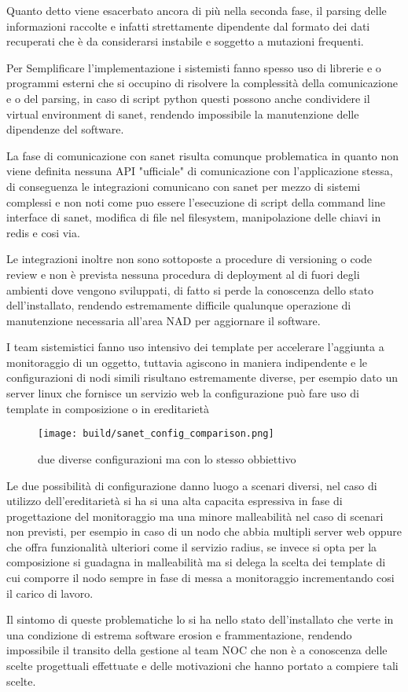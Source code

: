 Quanto detto viene esacerbato ancora di più nella seconda fase, il parsing delle informazioni raccolte e infatti strettamente dipendente dal formato dei dati recuperati che è da considerarsi instabile e soggetto a mutazioni frequenti.

Per Semplificare l'implementazione i sistemisti fanno spesso uso di librerie e o programmi esterni che si occupino di risolvere la complessità della comunicazione e o del parsing, in caso di script python questi possono anche condividere il virtual environment di sanet, rendendo impossibile la manutenzione delle dipendenze del software.

La fase di comunicazione con sanet risulta comunque problematica in quanto non viene definita nessuna API "ufficiale" di comunicazione con l'applicazione stessa, di conseguenza le integrazioni comunicano con sanet per mezzo di sistemi complessi e non noti come puo essere l'esecuzione di script della command line interface di sanet, modifica di file nel filesystem, manipolazione delle chiavi in redis e cosi via.

Le integrazioni inoltre non sono sottoposte a procedure di versioning o code review e non è prevista nessuna procedura di deployment al di fuori degli ambienti dove vengono sviluppati, di fatto si perde la conoscenza dello stato dell'installato, rendendo estremamente difficile qualunque operazione di manutenzione necessaria all'area NAD per aggiornare il software.

I team sistemistici fanno uso intensivo dei template per accelerare l'aggiunta a monitoraggio di un oggetto, tuttavia agiscono in maniera indipendente e le configurazioni di nodi simili risultano estremamente diverse, per esempio dato un server linux che fornisce un servizio web la configurazione può fare uso di template in composizione o in ereditarietà

\begin{figure}[H]
    \centering
    \texttt{[image: build/sanet\_config\_comparison.png]}
    \caption{due diverse configurazioni ma con lo stesso obbiettivo}
    \label{fig:enter-label}
\end{figure}

Le due possibilità di configurazione danno luogo a scenari diversi, nel caso di utilizzo dell'ereditarietà si ha si una alta capacita espressiva in fase di progettazione del monitoraggio ma una minore malleabilità nel caso di scenari non previsti, per esempio in caso di un nodo che abbia multipli server web oppure che offra funzionalità ulteriori come il servizio radius, se invece si opta per la composizione si guadagna in malleabilità ma si delega la scelta dei template di cui comporre il nodo sempre in fase di messa a monitoraggio incrementando cosi il carico di lavoro.

Il sintomo di queste problematiche lo si ha nello stato dell'installato che verte in una condizione di estrema software erosion e frammentazione, rendendo impossibile il transito della gestione al team NOC che non è a conoscenza delle scelte progettuali effettuate e delle motivazioni che hanno portato a compiere tali scelte.

